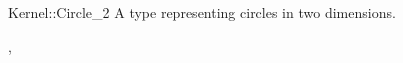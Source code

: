 \begin{ccRefConcept}{Kernel::Circle_2}
A type representing circles in two dimensions.

\ccRefines
{},

\ccSeeAlso
{}
\end{ccRefConcept}

